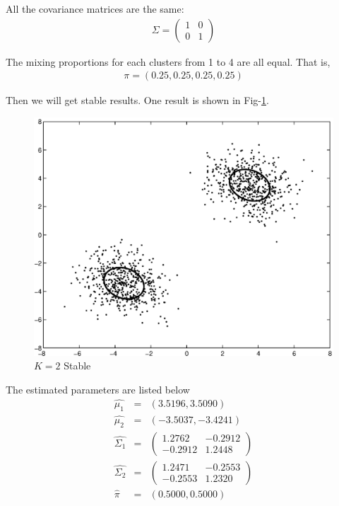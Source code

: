 \documentclass[12pt]{article}
\begin{document}
All the covariance matrices are the same:
\begin{eqnarray*}
  \Sigma =
  \begin{pmatrix}
    1 & 0 \\
    0 & 1
  \end{pmatrix}
\end{eqnarray*}

The mixing proportions for each clusters from 1 to 4 are all equal. That is,
\begin{eqnarray*}
  \pi = (0.25, 0.25, 0.25, 0.25)
\end{eqnarray*}

Then we will get stable results. One result is shown in Fig-\ref{fig:c3-3}. \\

\begin{figure}[ht!]
  \centering
  \includegraphics[width=0.7 \textwidth]{c3-3}
  \caption{$K = 2$ Stable \label{fig:c3-3}}
\end{figure}

The estimated parameters are listed below
\begin{eqnarray*}
\hat{\mu_1} &=& (3.5196,    3.5090) \\
\hat{\mu_2} &=& (-3.5037,   -3.4241) \\
\hat{\Sigma_1} &=&
  \begin{pmatrix}
    1.2762  & -0.2912 \\
   -0.2912  &  1.2448
  \end{pmatrix} \\
\hat{\Sigma_2} &=& 
  \begin{pmatrix}
    1.2471  & -0.2553 \\
   -0.2553  &  1.2320
  \end{pmatrix} \\
\hat{\pi} &=& (0.5000, 0.5000)
\end{eqnarray*}
\end{document}
